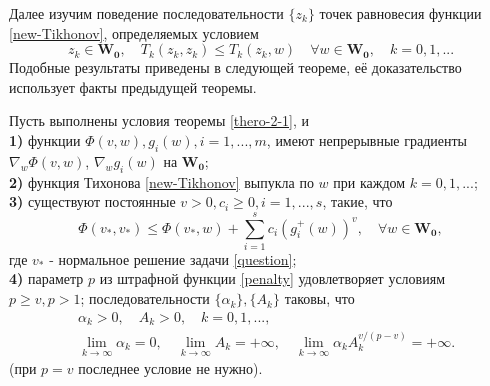 Далее изучим поведение последовательности $\{z_k \}$ точек равновесия  функции \eqref{new-Tikhonov}, определяемых условием 
\begin{equation}
\label{new-Tikhonov-condition}
z_k\in\mathbf{W_0},\quad T_k(z_k,z_k)\leqslant T_k(z_k,w)\quad \forall w\in\mathbf{W_0},\quad k=0,1,...
\end{equation}
Подобные результаты приведены в следующей теореме, её доказательство использует факты предыдущей теоремы.
\begin{theo}
	\label{thero-2-2}
	Пусть выполнены условия теоремы \ref{thero-2-1}, и\\
	\textbf{1)} функции $\Phi(v,w),g_i(w),i=1,...,m$, имеют непрерывные градиенты $\nabla_w\Phi(v,w)$, $\nabla_w g_i(w)$ на $\mathbf{W_0}$; \\
	\textbf{2)} функция Тихонова \eqref{new-Tikhonov} выпукла по $w$ при каждом $k=0,1,...$; \\
	\textbf{3)} существуют постоянные $v>0,c_i\geqslant 0,i=1,...,s$, такие, что 
	\begin{equation}
	\label{norm-condition}
	\Phi(v_*,v_*)\leqslant \Phi(v_*,w)+\sum_{i=1}^{s}c_i(g_i^+(w))^v,\quad \forall w\in\mathbf{W_0},
	\end{equation}
	где $v_*$ - нормальное решение задачи \eqref{question};\\
	\textbf{4)} параметр $p$ из штрафной функции \eqref{penalty} удовлетворяет условиям $p\geqslant v,p>1$; последовательности $\{\alpha_k \},\{A_k \}$ таковы, что
	\begin{equation}
	\label{parameter-condition-2}
	\begin{aligned}
	&\alpha_k>0,\quad A_k>0,\quad k=0,1,...,\quad\\
	&\lim\limits_{k\rightarrow\infty}\alpha_k=0,\quad \lim_{k\rightarrow\infty}A_k=+\infty,\quad\lim_{k\rightarrow\infty}\alpha _kA_k^{v/(p-v)}=+\infty.
	\end{aligned}
	\end{equation}
	(при $p=v$ последнее условие не нужно).
	

\end{theo}
